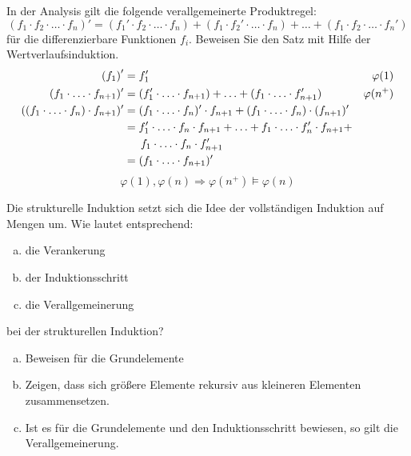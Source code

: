 \begin{card}
  In der Analysis gilt die folgende verallgemeinerte Produktregel:
  \[
  (f_1 \cdot f_2 \cdot \ldots \cdot f_n)' = (f_1' \cdot f_2 \cdot \ldots \cdot f_n) + (f_1 \cdot f_2' \cdot \ldots \cdot f_n) + \ldots + (f_1 \cdot f_2 \cdot \ldots \cdot f_n')
  \]
  für die differenzierbare Funktionen $f_i$. Beweisen Sie den Satz mit Hilfe der Wertverlaufsinduktion.
  \hr
  \begin{align*}
    \left( f_1 \right) ' &= f_1' & \varphi(1) \\
    (f_1 \cdot \ldots \cdot f_{n+1})' &= (f_1' \cdot \ldots \cdot f_{n+1}) + \ldots + (f_1 \cdot \ldots \cdot f_{n+1}') & \varphi(n^+) \\
    ((f_1 \cdot \ldots \cdot f_n) \cdot f_{n+1})'
    &= (f_1 \cdot \ldots \cdot f_n)' \cdot f_{n+1} + (f_1 \cdot \ldots \cdot f_n) \cdot (f_{n+1})' \\
    &= f_1' \cdot \ldots \cdot f_n \cdot f_{n+1} + \ldots + f_1 \cdot \ldots \cdot f_n' \cdot f_{n+1} + \\
    &\hspace{1.5em} f_1 \cdot \ldots \cdot f_n \cdot f_{n+1}' \\
    &= (f_1 \cdot \ldots \cdot f_{n+1})' \\
  \end{align*}
  \[ \varphi(1), \varphi(n) \Rightarrow \varphi(n^+) \vDash \varphi(n) \]
\end{card}

\begin{card}
	Die strukturelle Induktion setzt sich die Idee der vollständigen Induktion auf Mengen um. Wie lautet entsprechend:
  \begin{enumerate}[a)]
	  \item die Verankerung
	  \item der Induktionsschritt
	  \item die Verallgemeinerung
	\end{enumerate}
	bei der strukturellen Induktion?
	\hr
  \begin{enumerate}[a)]
	  \item Beweisen für die Grundelemente
	  \item Zeigen, dass sich größere Elemente rekursiv aus kleineren Elementen zusammensetzen.
	  \item Ist es für die Grundelemente und den Induktionsschritt bewiesen, so gilt die Verallgemeinerung.
	\end{enumerate}
\end{card}

